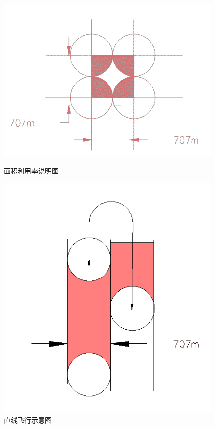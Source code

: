 \documentclass{whutmod}
\begin{document}
	\begin{figure}[H]
		\begin{minipage}[t]{0.5\linewidth}
		\centering
		\includegraphics[width=\textwidth]{figures/zhuanxiang.png}
		\caption{面积利用率说明图}\label{zhuanxiang}
		\end{minipage}
		\hfill%
		\begin{minipage}[t]{0.5\linewidth}
		\centering
		\includegraphics[width=\textwidth]{figures/zhuanxiang2.png}
		\caption{直线飞行示意图}\label{zhuanxiang1}
		\end{minipage}
	\end{figure}
\end{document}
